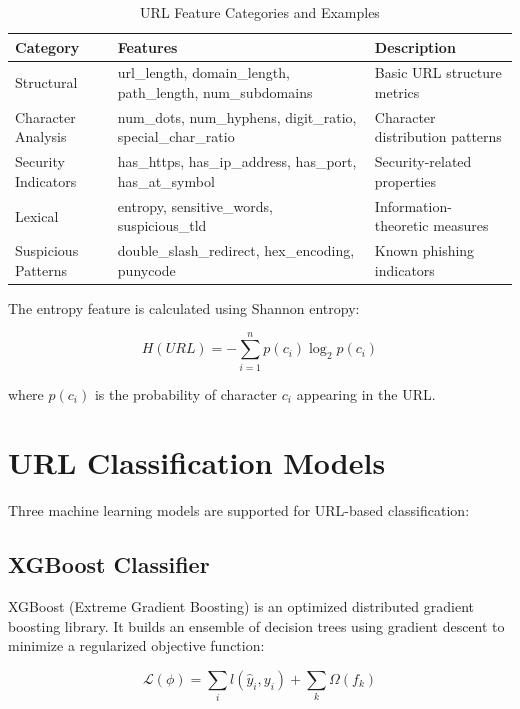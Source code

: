 \documentclass[12pt,a4paper]{report}
\begin{document}
\begin{table}[h!]
\centering
\caption{URL Feature Categories and Examples}
\label{tab:url_features}
\begin{tabular}{|p{3cm}|p{5cm}|p{5cm}|}
\hline
\textbf{Category} & \textbf{Features} & \textbf{Description} \\
\hline
Structural & url\_length, domain\_length, path\_length, num\_subdomains & Basic URL structure metrics \\
\hline
Character Analysis & num\_dots, num\_hyphens, digit\_ratio, special\_char\_ratio & Character distribution patterns \\
\hline
Security Indicators & has\_https, has\_ip\_address, has\_port, has\_at\_symbol & Security-related properties \\
\hline
Lexical & entropy, sensitive\_words, suspicious\_tld & Information-theoretic measures \\
\hline
Suspicious Patterns & double\_slash\_redirect, hex\_encoding, punycode & Known phishing indicators \\
\hline
\end{tabular}
\end{table}

The entropy feature is calculated using Shannon entropy:

\begin{equation}
H(URL) = -\sum_{i=1}^{n} p(c_i) \log_2 p(c_i)
\label{eq:entropy}
\end{equation}

where $p(c_i)$ is the probability of character $c_i$ appearing in the URL.

\section{URL Classification Models}

Three machine learning models are supported for URL-based classification:

\subsection{XGBoost Classifier}
XGBoost (Extreme Gradient Boosting) is an optimized distributed gradient boosting library. It builds an ensemble of decision trees using gradient descent to minimize a regularized objective function:

\begin{equation}
\mathcal{L}(\phi) = \sum_{i} l(\hat{y}_i, y_i) + \sum_{k} \Omega(f_k)
\end{equation}
\end{document}
